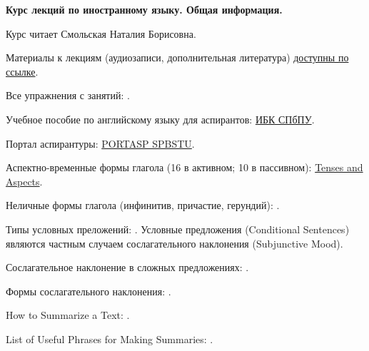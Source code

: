 \documentclass[main.tex]{subfiles}
\begin{document}
{\parindent0pt

\textbf{Курс лекций по иностранному языку. Общая информация.}

\vspace{5pt}

Курс читает Смольская Наталия Борисовна.

Материалы к лекциям (аудиозаписи, дополнительная литература) \href{https://drive.google.com/drive/folders/1iSx2EjJJ98rhPpOsM4xGcJA7-7qitQHM?usp=sharing}{доступны по ссылке}.

Все упражнения с занятий: \hyperref[sec:all-tasks-lk]{\color{blue}{УПРАЖНЕНИЯ}}.

Учебное пособие по английскому языку для аспирантов: \href{https://elib.spbstu.ru/dl/2/s19-119.pdf/info}{ИБК СПбПУ}.

Портал аспирантуры: \href{https://portasp.spbstu.ru/login/index.php}{PORTASP SPBSTU}.

\vspace{5pt}

Аспектно-временные формы глагола (16 в активном; 10 в пассивном): \href{https://mualal.github.io/asp/english/EnglishTensesAspectsVoicesPoster.pdf}{Tenses and Aspects}.

\vspace{5pt}

Неличные формы глагола (инфинитив, причастие, герундий): \hyperref[subsec:impersonal-lk]{\color{blue}{IMPERSONAL FORMS}}.

\vspace{5pt}

Типы условных преложений: \hyperref[subsec:conditionals-types]{\color{blue}{CONDITIONALS}}. Условные предложения (Conditional Sentences) являются частным случаем сослагательного наклонения (Subjunctive Mood).

\vspace{5pt}

Сослагательное наклонение в сложных предложениях: \hyperref[subsec:subjunctive-mood-lk]{\color{blue}{SUBJUNCTIVE MOOD}}.

Формы сослагательного наклонения: \hyperlink{subjunctive-mood-forms-table}{\color{blue}{Subjunctive Mood Forms}}.

\vspace{5pt}

How to Summarize a Text: \hyperref[subsec:tips-on-summarizing]{\color{blue}{TIPS ON SUMMARIZING}}.

List of Useful Phrases for Making Summaries: \hyperref[subsec:list-of-useful-phrases-for-making-summaries]{\color{blue}{LIST OF PHRASES}}.

}
\end{document}
